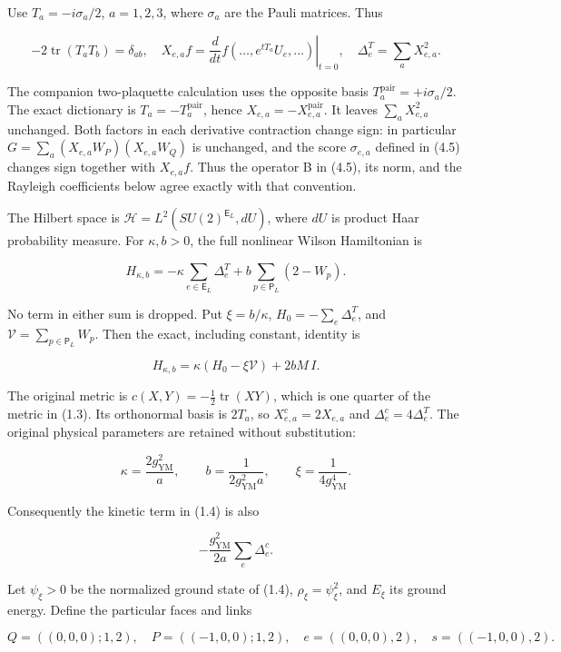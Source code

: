 Use \(T_a=-i\sigma_a/2\), \(a=1,2,3\), where \(\sigma_a\) are the Pauli
matrices. Thus

\[
-2\operatorname{tr}(T_aT_b)=\delta_{ab},\quad
X_{e,a}f=\left.\frac{d}{dt}f(\ldots,e^{tT_a}U_e,\ldots)\right|_{t=0},
\quad \Delta_e^T=\sum_aX_{e,a}^2.
\tag{1.3}
\]

The companion two-plaquette calculation uses the opposite basis
\(T_a^{\mathrm{pair}}=+i\sigma_a/2\). The exact dictionary is
\(T_a=-T_a^{\mathrm{pair}}\), hence
\(X_{e,a}=-X_{e,a}^{\mathrm{pair}}\). It leaves \(\sum_aX_{e,a}^2\)
unchanged. Both factors in each derivative contraction change sign: in
particular \(G=\sum_a(X_{e,a}W_P)(X_{e,a}W_Q)\) is unchanged, and the
score \(\sigma_{e,a}\) defined in (4.5) changes sign together with
\(X_{e,a}f\). Thus the operator B in (4.5), its norm, and the Rayleigh
coefficients below agree exactly with that convention.

The Hilbert space is \(\mathcal H=L^2(SU(2)^{\mathsf E_L},dU)\), where
\(dU\) is product Haar probability measure. For \(\kappa,b>0\), the full
nonlinear Wilson Hamiltonian is

\[
H_{\kappa,b}=-\kappa\sum_{e\in\mathsf E_L}\Delta_e^T
 +b\sum_{p\in\mathsf P_L}(2-W_p).
\tag{1.4}
\]

No term in either sum is dropped. Put \(\xi=b/\kappa\),
\(H_0=-\sum_e\Delta_e^T\), and \(\mathcal V=\sum_{p\in\mathsf P_L}W_p\).
Then the exact, including constant, identity is

\[
\boxed{H_{\kappa,b}=\kappa(H_0-\xi\mathcal V)+2bM\,I.}
\tag{1.5}
\]

The original metric is \(c(X,Y)=-\tfrac12\operatorname{tr}(XY)\), which
is one quarter of the metric in (1.3). Its orthonormal basis is
\(2T_a\), so \(X_{e,a}^c=2X_{e,a}\) and \(\Delta_e^c=4\Delta_e^T\). The
original physical parameters are retained without substitution:

\[
\kappa=\frac{2g_{\mathrm{YM}}^2}{a},\qquad
b=\frac{1}{2g_{\mathrm{YM}}^2a},\qquad
\xi=\frac{1}{4g_{\mathrm{YM}}^4}.
\tag{1.6}
\]

Consequently the kinetic term in (1.4) is also

\[
-\frac{g_{\mathrm{YM}}^2}{2a}\sum_e\Delta_e^c.
\]

Let \(\psi_\xi>0\) be the normalized ground state of (1.4),
\(\rho_\xi=\psi_\xi^2\), and \(E_\xi\) its ground energy. Define the
particular faces and links

\[
Q=((0,0,0);1,2),\quad P=((-1,0,0);1,2),
\quad e=((0,0,0),2),\quad s=((-1,0,0),2).
\tag{1.7}
\]

